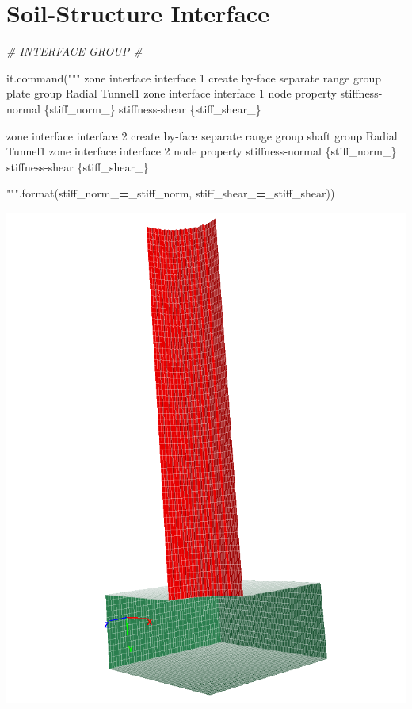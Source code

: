 \documentclass[a4paper, nobind]{templates/ociamthesis}
\newenvironment{Shaded}{\begin{snugshade}}{\end{snugshade}}
\newcommand{\BuiltInTok}[1]{#1}
\newcommand{\CommentTok}[1]{\textcolor[rgb]{0.56,0.35,0.01}{\textit{#1}}}
\newcommand{\NormalTok}[1]{#1}
\newcommand{\OperatorTok}[1]{\textcolor[rgb]{0.81,0.36,0.00}{\textbf{#1}}}
\newcommand{\SpecialCharTok}[1]{\textcolor[rgb]{0.00,0.00,0.00}{#1}}
\newcommand{\StringTok}[1]{\textcolor[rgb]{0.31,0.60,0.02}{#1}}
\renewenvironment{Shaded}
{
  \vspace{10pt}%
  \begin{snugshade}%
}{%
  \end{snugshade}%
  \vspace{8pt}%
}
\begin{document}
\hypertarget{soil-structure-interface}{%
\section{Soil-Structure Interface}\label{soil-structure-interface}}

\begin{Shaded}
\begin{Highlighting}[]
\CommentTok{\# INTERFACE GROUP \#}

\NormalTok{it.command(}\StringTok{"""}
\StringTok{zone interface \textquotesingle{}interface 1\textquotesingle{} create by{-}face separate range group \textquotesingle{}plate\textquotesingle{} group \textquotesingle{}Radial Tunnel1\textquotesingle{}}
\StringTok{zone interface \textquotesingle{}interface 1\textquotesingle{} node property stiffness{-}normal }\SpecialCharTok{\{stiff\_norm\_\}}\StringTok{ stiffness{-}shear }\SpecialCharTok{\{stiff\_shear\_\}}

\StringTok{zone interface \textquotesingle{}interface 2\textquotesingle{} create by{-}face separate range group \textquotesingle{}shaft\textquotesingle{} group \textquotesingle{}Radial Tunnel1\textquotesingle{}}
\StringTok{zone interface \textquotesingle{}interface 2\textquotesingle{} node property stiffness{-}normal }\SpecialCharTok{\{stiff\_norm\_\}}\StringTok{ stiffness{-}shear }\SpecialCharTok{\{stiff\_shear\_\}}

\StringTok{"""}\NormalTok{.}\BuiltInTok{format}\NormalTok{(stiff\_norm\_}\OperatorTok{=}\NormalTok{\_stiff\_norm, stiff\_shear\_}\OperatorTok{=}\NormalTok{\_stiff\_shear))}
\end{Highlighting}
\end{Shaded}

\includegraphics[width=1\linewidth]{myfigureeeeee/interface-both}
\end{document}
